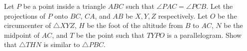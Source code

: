 Let $P$ be a point inside a triangle $ABC$ such that $\angle PAC= \angle PCB$. Let the projections of $P$ onto $BC$, $CA$, and $AB$ be $X,Y,Z$ respectively. Let $O$ be the circumcenter of $\triangle XYZ$, $H$ be the foot of the altitude from $B$ to $AC$, $N$ be the midpoint of $AC$, and $T$ be the point such that $TYPO$ is a parallelogram.  Show that $\triangle THN$ is similar to $\triangle PBC$.

